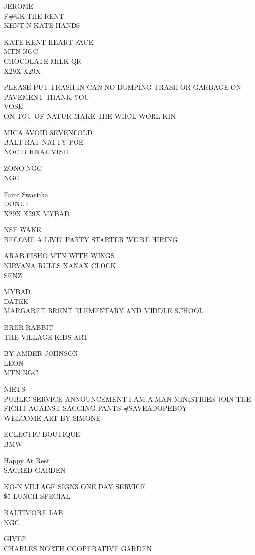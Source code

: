 \documentclass[10pt,letterpaper]{article}
\begin{document}
JEROME\\
F\#@K THE RENT\\
KENT N KATE HANDS

KATE KENT HEART FACE\\
MTN NGC\\
CHOCOLATE MILK QR\\
X29X X29X

PLEASE PUT TRASH IN CAN NO DUMPING TRASH OR GARBAGE ON PAVEMENT THANK YOU\\
VOSE\\
ON TOU OF NATUR MAKE THE WHOL WORL KIN

MICA AVOID SEVENFOLD\\
BALT RAT NATTY POE\\
NOCTURNAL VISIT

ZONO NGC\\
NGC

Faint Swastika\\
DONUT\\
X29X X29X MYBAD

NSF WAKE\\
BECOME A LIVE! PARTY STARTER WE'RE HIRING

ARAB FISHO MTN WITH WINGS\\
NIRVANA RULES XANAX CLOCK\\
SENZ

MYBAD\\
DATEK\\
MARGARET BRENT ELEMENTARY AND MIDDLE SCHOOL

BRER RABBIT\\
THE VILLAGE KIDS ART

BY AMBER JOHNSON\\
LEON\\
MTN NGC

NIETS\\
PUBLIC SERVICE ANNOUNCEMENT I AM A MAN MINISTRIES JOIN THE FIGHT AGAINST SAGGING PANTS \#SAVEADOPEBOY\\
WELCOME ART BY SIMONE

ECLECTIC BOUTIQUE\\
BMW

Happy At Rest\\
SACRED GARDEN

KO{-}N VILLAGE SIGNS ONE DAY SERVICE\\
\$5 LUNCH SPECIAL

BALTIMORE LAB\\
NGC

GIVER\\
CHARLES NORTH COOPERATIVE GARDEN
\end{document}
